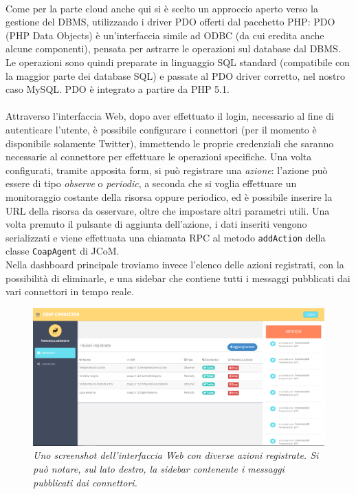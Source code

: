 \\Come per la parte cloud anche qui si è scelto un approccio aperto verso la gestione del DBMS, utilizzando i driver PDO offerti dal pacchetto PHP: PDO (PHP Data Objects) è un'interfaccia simile ad ODBC (da cui eredita anche alcune componenti), pensata per astrarre le operazioni sul database dal DBMS. Le operazioni sono quindi preparate in linguaggio SQL standard (compatibile con la maggior parte dei database SQL) e passate al PDO driver corretto, nel nostro caso MySQL. PDO è integrato a partire da PHP 5.1.
\\\\Attraverso l'interfaccia Web, dopo aver effettuato il login, necessario al fine di autenticare l'utente, è possibile configurare i connettori (per il momento è disponibile solamente Twitter), immettendo le proprie credenziali che saranno necessarie al connettore per effettuare le operazioni specifiche. Una volta configurati, tramite apposita form, si può registrare una \textit{azione}: l'azione può essere di tipo \textit{observe} o \textit{periodic}, a seconda che si voglia effettuare un monitoraggio costante della risorsa oppure periodico, ed è possibile inserire la URL della risorsa da osservare, oltre che impostare altri parametri utili. Una volta premuto il pulsante di aggiunta dell'azione, i dati inseriti vengono serializzati e viene effettuata una chiamata RPC al metodo {\tt addAction} della classe {\tt CoapAgent} di JCoM.
\\Nella dashboard principale troviamo invece l'elenco delle azioni registrati, con la possibilità di eliminarle, e una sidebar che contiene tutti i messaggi pubblicati dai vari connettori in tempo reale.

\begin{figure}[h]
\centering
\includegraphics[width=\textwidth]{immagini/interfaccia-web.PNG}
\caption{\textit{Uno screenshot dell'interfaccia Web con diverse azioni registrate. Si può notare, sul lato destro, la sidebar contenente i messaggi pubblicati dai connettori.}}
\end{figure}


